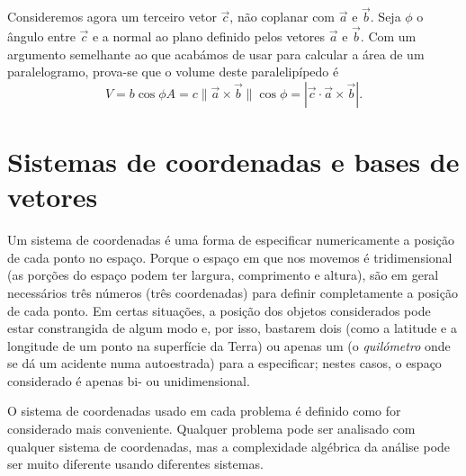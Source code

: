 Consideremos agora um terceiro vetor $\vec c$, não coplanar com $\vec a$ e $\vec
b$. Seja $\phi$ o ângulo entre $\vec c$ e a normal ao plano definido pelos
vetores $\vec a$ e $\vec b$. Com um argumento semelhante ao que acabámos de
usar para calcular a área de um paralelogramo, prova-se que o volume deste
paralelipípedo é
\begin{equation}
V=b\cos\phi A = c \|\vec a\times\vec b\| \cos\phi=
\left|\vec c\cdot\vec a\times\vec b\right|.
\end{equation}

\section{Sistemas de coordenadas e bases de vetores}
Um sistema de coordenadas é uma forma de especificar numericamente a posição de
cada ponto no espaço. Porque o espaço em que nos movemos é tridimensional (as
porções do espaço podem ter largura, comprimento e altura), são em geral necessários
três números (três coordenadas) para definir completamente a posição de cada
ponto. Em certas situações, a posição dos objetos considerados pode estar
constrangida de algum modo e, por isso, bastarem dois (como a latitude e a
longitude de um ponto na superfície da Terra) ou apenas um (o \emph{quilómetro}
onde se dá um acidente numa autoestrada) para a especificar; nestes
casos, o espaço considerado é apenas bi- ou unidimensional.

O sistema de coordenadas usado em cada problema é definido como for considerado
mais conveniente. Qualquer problema pode ser analisado com qualquer sistema de
coordenadas, mas a complexidade algébrica da análise pode ser muito diferente
usando diferentes sistemas.


